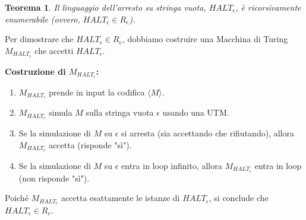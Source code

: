 \documentclass[a4paper]{article}
\makeatletter
\newtheorem{theorem}{Teorema}[section] %
\renewenvironment{proof}[1][\proofname]{\par
  \pushQED{\qed}%
  \normalfont \topsep6\p@\@plus6\p@\relax
  \trivlist
  \item[\hskip\labelsep
        \bfseries
    #1\@addpunct{.}]\ignorespaces
}{%
  \popQED\endtrivlist\@endpefalse
}
\makeatother
\begin{document}
\begin{theorem}
Il linguaggio dell'arresto su stringa vuota, $HALT_\epsilon$, è ricorsivamente enumerabile (ovvero, $HALT_\epsilon \in R_e$).
\end{theorem}
\begin{proof}
Per dimostrare che $HALT_\epsilon \in R_e$, dobbiamo costruire una Macchina di Turing $M_{HALT_\epsilon}$ che accetti $HALT_\epsilon$.

\textbf{Costruzione di $M_{HALT_\epsilon}$:}
\begin{enumerate}
    \item $M_{HALT_\epsilon}$ prende in input la codifica $\langle M \rangle$.
    \item $M_{HALT_\epsilon}$ simula $M$ sulla stringa vuota $\epsilon$ usando una UTM.
    \item Se la simulazione di $M$ su $\epsilon$ si arresta (sia accettando che rifiutando), allora $M_{HALT_\epsilon}$ accetta (risponde "sì").
    \item Se la simulazione di $M$ su $\epsilon$ entra in loop infinito, allora $M_{HALT_\epsilon}$ entra in loop (non risponde "sì").
\end{enumerate}
Poiché $M_{HALT_\epsilon}$ accetta esattamente le istanze di $HALT_\epsilon$, si conclude che $HALT_\epsilon \in R_e$.
\end{proof}
\end{document}
